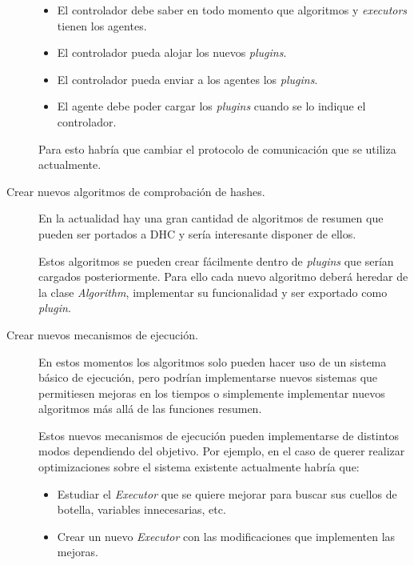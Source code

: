 \begin{description}
		\begin{itemize}
			\item El controlador debe saber en todo momento que algoritmos y \emph{executors} tienen los agentes.

			\item El controlador pueda alojar los nuevos \emph{plugins}.

			\item El controlador pueda enviar a los agentes los \emph{plugins}.

			\item El agente debe poder cargar los \emph{plugins} cuando se lo indique el controlador.
		\end{itemize}

		Para esto habría que cambiar el protocolo de comunicación que se utiliza actualmente.

	\item[Crear nuevos algoritmos de comprobación de hashes.]

		En la actualidad hay una gran cantidad de algoritmos de resumen que pueden ser portados a  DHC y sería interesante disponer de ellos.

		Estos algoritmos se pueden crear fácilmente dentro de \emph{plugins} que serían cargados posteriormente. Para ello cada nuevo algoritmo deberá heredar de la clase \emph{Algorithm}, implementar su funcionalidad y ser exportado como \emph{plugin}.

	\item[Crear nuevos mecanismos de ejecución.]

		En estos momentos los algoritmos solo pueden hacer uso de un sistema básico de ejecución, pero podrían implementarse nuevos sistemas que permitiesen mejoras en los tiempos o simplemente implementar nuevos algoritmos más allá de las funciones resumen.

		Estos nuevos mecanismos de ejecución pueden implementarse de distintos modos dependiendo del objetivo. Por ejemplo, en el caso de querer realizar optimizaciones sobre el sistema existente actualmente habría que:

		\begin{itemize}
			\item Estudiar el \emph{Executor} que se quiere mejorar para buscar sus cuellos de botella, variables innecesarias, etc.

			\item Crear un nuevo \emph{Executor} con las modificaciones que implementen las mejoras.


\end{itemize}
\end{description}
